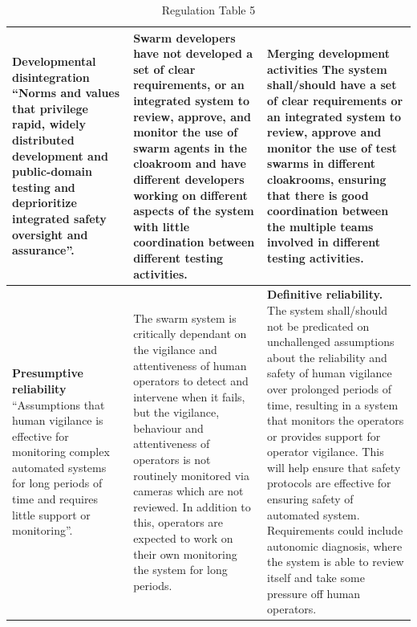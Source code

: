 \documentclass[lettersize,journal]{IEEEtran}
\begin{document}
\begin{landscape}
\begin{table}[]
\begin{tabular}{|p{0.3\textheight}|p{0.3\textheight}|p{0.4\textheight}|}
        \hline
        \textbf{Developmental disintegration} ``Norms and values that privilege rapid, widely distributed development and public-domain testing and deprioritize integrated safety oversight and assurance”. \cite{macrae2021learning} & Swarm developers have not developed a set of clear requirements, or an integrated system to review, approve, and monitor the use of swarm agents in the cloakroom and have different developers working on different aspects of the system with little coordination between different testing activities. & \textbf{Merging development activities} The system shall/should have a set of clear requirements or an integrated system to review, approve and monitor the use of test swarms in different cloakrooms, ensuring that there is good coordination between the multiple teams involved in different testing activities. \\
        \hline
        \textbf{Presumptive reliability } ``Assumptions that human vigilance is effective for monitoring complex automated systems for long periods of time and requires little support or monitoring”. \cite{macrae2021learning} & The swarm system is critically dependant on the vigilance and attentiveness of human operators to detect and intervene when it fails, but the vigilance, behaviour and attentiveness of operators is not routinely monitored via cameras which are not reviewed. In addition to this, operators are expected to work on their own monitoring the system for long periods. & \textbf{Definitive reliability.} The system shall/should not be predicated on unchallenged assumptions about the reliability and safety of human vigilance over prolonged periods of time, resulting in a system that monitors the operators or provides support for operator vigilance. This will help ensure that safety protocols are effective for ensuring safety of automated system. Requirements could include autonomic diagnosis, where the system is able to review itself and take some pressure off human operators. \\
        \hline
    \end{tabular}
    \caption{Regulation Table 5}
    \label{tab:tab_5}
\end{table}
\end{landscape}




\newpage

\vfill
\end{document}
